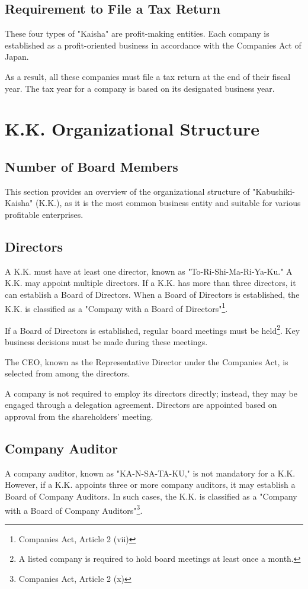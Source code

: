 \subsection{Requirement to File a Tax Return}
These four types of "Kaisha" are profit-making entities. Each company is established as a profit-oriented business in accordance with the Companies Act of Japan.

As a result, all these companies must file a tax return at the end of their fiscal year. The tax year for a company is based on its designated business year.

\section{K.K. Organizational Structure}
\subsection{Number of Board Members}
This section provides an overview of the organizational structure of "Kabushiki-Kaisha" (K.K.), as it is the most common business entity and suitable for various profitable enterprises.

\subsection{Directors}
A K.K. must have at least one director, known as "To-Ri-Shi-Ma-Ri-Ya-Ku." A K.K. may appoint multiple directors. If a K.K. has more than three directors, it can establish a Board of Directors. When a Board of Directors is established, the K.K. is classified as a "Company with a Board of Directors"\footnote{Companies Act, Article 2 (vii)}.

If a Board of Directors is established, regular board meetings must be held\footnote{A listed company is required to hold board meetings at least once a month.}. Key business decisions must be made during these meetings.

The CEO, known as the Representative Director under the Companies Act, is selected from among the directors.

A company is not required to employ its directors directly; instead, they may be engaged through a delegation agreement. Directors are appointed based on approval from the shareholders' meeting.

\subsection{Company Auditor}
A company auditor, known as "KA-N-SA-TA-KU," is not mandatory for a K.K. However, if a K.K. appoints three or more company auditors, it may establish a Board of Company Auditors. In such cases, the K.K. is classified as a "Company with a Board of Company Auditors"\footnote{Companies Act, Article 2 (x)}.

